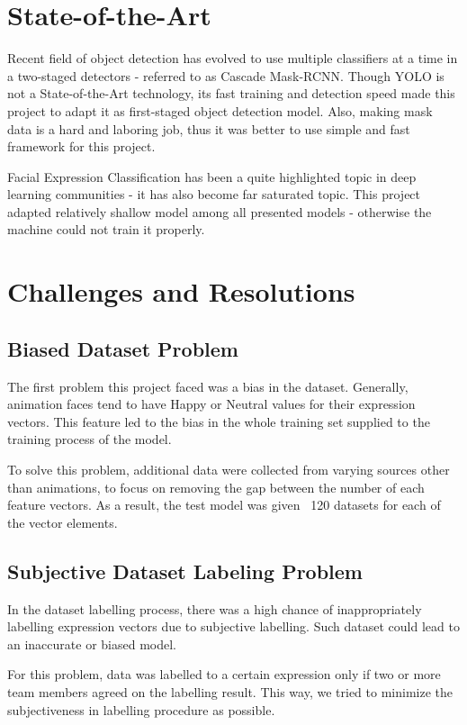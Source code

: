 \documentclass{article}
\begin{document}
\section{State-of-the-Art}
Recent field of object detection has evolved to use multiple classifiers at a
time in a two-staged detectors - referred to as Cascade Mask-RCNN. Though YOLO
is not a State-of-the-Art technology, its fast training and detection speed made
this project to adapt it as first-staged object detection model. Also, making
mask data is a hard and laboring job, thus it was better to use simple and fast
framework for this project.

Facial Expression Classification has been a quite highlighted topic in deep
learning communities - it has also become far saturated topic. This project
adapted relatively shallow model among all presented models - otherwise the
machine could not train it properly.

\section{Challenges and Resolutions}
\subsection{Biased Dataset Problem}
The first problem this project faced was a bias in the dataset. Generally,
animation faces tend to have Happy or Neutral values for their expression
vectors. This feature led to the bias in the whole training set supplied to the
training process of the model.

To solve this problem, additional data were collected from varying sources other
than animations, to focus on removing the gap between the number of each feature
vectors. As a result, the test model was given ~120 datasets for each of the
vector elements.

\subsection{Subjective Dataset Labeling Problem}
In the dataset labelling process, there was a high chance of inappropriately
labelling expression vectors due to subjective labelling. Such dataset could
lead to an inaccurate or biased model.

For this problem, data was labelled to a certain expression only if two or more
team members agreed on the labelling result. This way, we tried to minimize the
subjectiveness in labelling procedure as possible.
\end{document}
